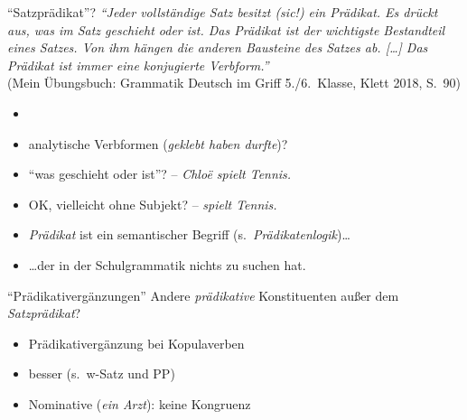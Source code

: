 \begin{frame}
  {"`Satzprädikat"'?}
  \pause
  \textit{"`Jeder vollständige Satz besitzt (sic!) ein Prädikat. Es drückt aus, was im Satz geschieht oder ist. Das Prädikat ist der wichtigste Bestandteil eines Satzes. Von ihm hängen die anderen Bausteine des Satzes ab. [\ldots] Das Prädikat ist immer eine konjugierte Verbform."'}\\
  \pause\Viertelzeile
  {\small (Mein Übungsbuch: Grammatik Deutsch im Griff 5.\slash 6.~Klasse, Klett 2018, S.~90)}
  \pause
  \Halbzeile
  \begin{itemize}[<+->]
    \item {}
    \item analytische Verbformen (\textit{geklebt haben durfte})?
    \item "`was geschieht oder ist"'? -- \textit{Chloë spielt Tennis.}
    \item OK, vielleicht ohne Subjekt? -- \textit{spielt Tennis.}
      \Halbzeile
    \item \textit{Prädikat} ist ein \alert{semantischer Begriff} (s.~\textit{Prädikatenlogik})\ldots
    \item \ldots der \alert{in der Schulgrammatik nichts zu suchen hat}.
  \end{itemize}
\end{frame}

\begin{frame}
  {"`Prädikativergänzungen"'}
  \pause
  Andere \textit{prädikative} Konstituenten außer dem \textit{Satzprädikat}?\\
  \Halbzeile
  \begin{exe}
    \ex\label{ex:praedikative022}
    \begin{xlist}
      \pause
      \pause
      \pause
    \end{xlist}
  \end{exe}
  \pause
  \Halbzeile
  \begin{itemize}[<+->]
    \item \alert{Prädikativergänzung} bei Kopulaverben
    \item besser  (s.~w-Satz und PP)
    \item Nominative (\textit{ein Arzt}): keine Kongruenz
  \end{itemize}
\end{frame}

